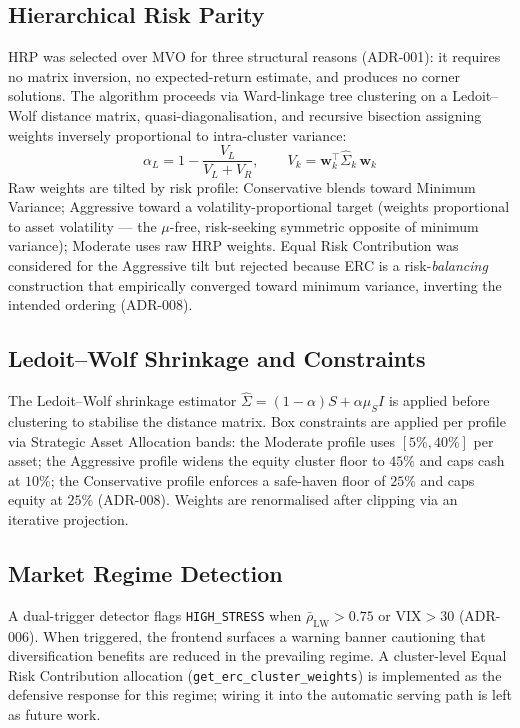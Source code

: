 \documentclass[11pt, a4paper]{article}
\begin{document}
\subsection{Hierarchical Risk Parity}
HRP \parencite{LopezdePrado2016} was selected over MVO for three structural reasons (ADR-001): it requires no matrix inversion, no expected-return estimate, and produces no corner solutions. The algorithm proceeds via Ward-linkage tree clustering on a Ledoit--Wolf distance matrix, quasi-diagonalisation, and recursive bisection assigning weights inversely proportional to intra-cluster variance:
\[
  \alpha_L = 1 - \frac{V_L}{V_L + V_R}, \qquad V_k = \mathbf{w}_k^\top \hat{\Sigma}_k\,\mathbf{w}_k
\]
Raw weights are tilted by risk profile: Conservative blends toward Minimum Variance; Aggressive toward a volatility-proportional target (weights proportional to asset volatility — the $\mu$-free, risk-seeking symmetric opposite of minimum variance); Moderate uses raw HRP weights. Equal Risk Contribution \parencite{Maillard2010} was considered for the Aggressive tilt but rejected because ERC is a risk-\emph{balancing} construction that empirically converged toward minimum variance, inverting the intended ordering (ADR-008).

\subsection{Ledoit--Wolf Shrinkage and Constraints}
The Ledoit--Wolf shrinkage estimator \parencite{LedoitWolf2004} $\hat{\Sigma} = (1-\alpha)S + \alpha\mu_S I$ is applied before clustering to stabilise the distance matrix. Box constraints are applied per profile via Strategic Asset Allocation bands: the Moderate profile uses $[5\%, 40\%]$ per asset; the Aggressive profile widens the equity cluster floor to $45\%$ and caps cash at $10\%$; the Conservative profile enforces a safe-haven floor of $25\%$ and caps equity at $25\%$ (ADR-008). Weights are renormalised after clipping via an iterative projection.

\subsection{Market Regime Detection}
A dual-trigger detector flags \texttt{HIGH\_STRESS} when $\bar{\rho}_{\mathrm{LW}} > 0.75$ or $\mathrm{VIX} > 30$ (ADR-006). When triggered, the frontend surfaces a warning banner cautioning that diversification benefits are reduced in the prevailing regime. A cluster-level Equal Risk Contribution allocation (\texttt{get\_erc\_cluster\_weights}) is implemented as the defensive response for this regime; wiring it into the automatic serving path is left as future work.
\end{document}
